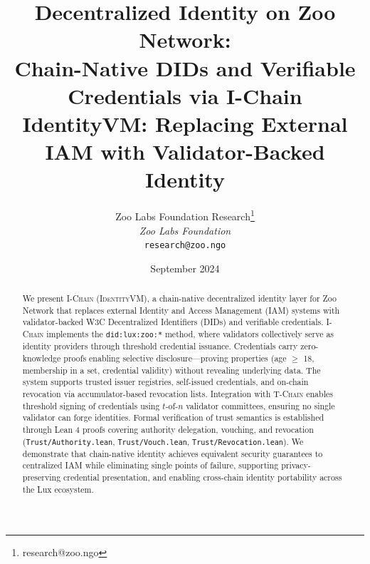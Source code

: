 \documentclass[11pt,letterpaper]{article}
\title{\textbf{Decentralized Identity on Zoo Network:\\Chain-Native DIDs and Verifiable Credentials via I-Chain}\\
\large IdentityVM: Replacing External IAM with Validator-Backed Identity}
\author{
Zoo Labs Foundation Research\thanks{research@zoo.ngo}\\
\textit{Zoo Labs Foundation}\\
\texttt{research@zoo.ngo}
}
\date{September 2024}
\theoremstyle{definition}
\theoremstyle{remark}
\newcommand{\IChain}{\textsc{I-Chain}}
\newcommand{\TChain}{\textsc{T-Chain}}
\newcommand{\IdentityVM}{\textsc{IdentityVM}}
\begin{document}
\zoocoverpage

\begin{abstract}
We present \IChain{} (\IdentityVM{}), a chain-native decentralized identity layer for Zoo Network that replaces external Identity and Access Management (IAM) systems with validator-backed W3C Decentralized Identifiers (DIDs) and verifiable credentials. \IChain{} implements the \texttt{did:lux:zoo:*} method, where validators collectively serve as identity providers through threshold credential issuance. Credentials carry zero-knowledge proofs enabling selective disclosure---proving properties (age $\geq$ 18, membership in a set, credential validity) without revealing underlying data. The system supports trusted issuer registries, self-issued credentials, and on-chain revocation via accumulator-based revocation lists. Integration with \TChain{} enables threshold signing of credentials using $t$-of-$n$ validator committees, ensuring no single validator can forge identities. Formal verification of trust semantics is established through Lean 4 proofs covering authority delegation, vouching, and revocation (\texttt{Trust/Authority.lean}, \texttt{Trust/Vouch.lean}, \texttt{Trust/Revocation.lean}). We demonstrate that chain-native identity achieves equivalent security guarantees to centralized IAM while eliminating single points of failure, supporting privacy-preserving credential presentation, and enabling cross-chain identity portability across the Lux ecosystem.
\end{abstract}

\tableofcontents
\newpage












\end{document}
